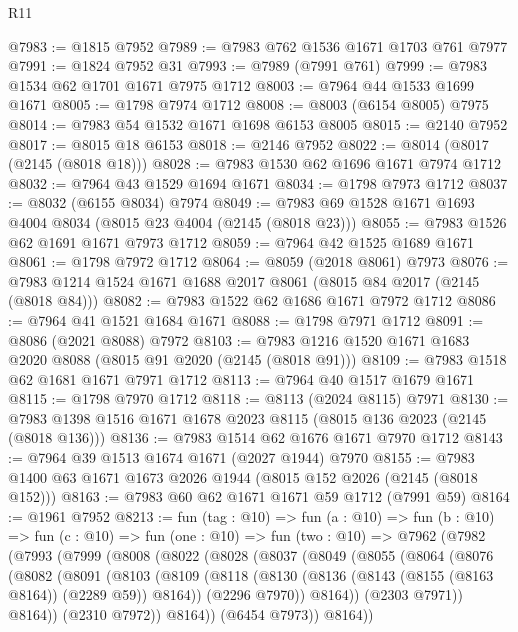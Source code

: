 \begin{lexlean}{R11}
\begin{coremodule}
@7983 := @1815 @7952
@7989 := @7983 @762 @1536 @1671 @1703 @761 @7977
@7991 := @1824 @7952 @31
@7993 := @7989 (@7991 @761)
@7999 := @7983 @1534 @62 @1701 @1671 @7975 @1712
@8003 := @7964 @44 @1533 @1699 @1671
@8005 := @1798 @7974 @1712
@8008 := @8003 (@6154 @8005) @7975
@8014 := @7983 @54 @1532 @1671 @1698 @6153 @8005
@8015 := @2140 @7952
@8017 := @8015 @18 @6153
@8018 := @2146 @7952
@8022 := @8014 (@8017 (@2145 (@8018 @18)))
@8028 := @7983 @1530 @62 @1696 @1671 @7974 @1712
@8032 := @7964 @43 @1529 @1694 @1671
@8034 := @1798 @7973 @1712
@8037 := @8032 (@6155 @8034) @7974
@8049 := @7983 @69 @1528 @1671 @1693 @4004 @8034 (@8015 @23 @4004 (@2145 (@8018 @23)))
@8055 := @7983 @1526 @62 @1691 @1671 @7973 @1712
@8059 := @7964 @42 @1525 @1689 @1671
@8061 := @1798 @7972 @1712
@8064 := @8059 (@2018 @8061) @7973
@8076 := @7983 @1214 @1524 @1671 @1688 @2017 @8061 (@8015 @84 @2017 (@2145 (@8018 @84)))
@8082 := @7983 @1522 @62 @1686 @1671 @7972 @1712
@8086 := @7964 @41 @1521 @1684 @1671
@8088 := @1798 @7971 @1712
@8091 := @8086 (@2021 @8088) @7972
@8103 := @7983 @1216 @1520 @1671 @1683 @2020 @8088 (@8015 @91 @2020 (@2145 (@8018 @91)))
@8109 := @7983 @1518 @62 @1681 @1671 @7971 @1712
@8113 := @7964 @40 @1517 @1679 @1671
@8115 := @1798 @7970 @1712
@8118 := @8113 (@2024 @8115) @7971
@8130 := @7983 @1398 @1516 @1671 @1678 @2023 @8115 (@8015 @136 @2023 (@2145 (@8018 @136)))
@8136 := @7983 @1514 @62 @1676 @1671 @7970 @1712
@8143 := @7964 @39 @1513 @1674 @1671 (@2027 @1944) @7970
@8155 := @7983 @1400 @63 @1671 @1673 @2026 @1944 (@8015 @152 @2026 (@2145 (@8018 @152)))
@8163 := @7983 @60 @62 @1671 @1671 @59 @1712 (@7991 @59)
@8164 := @1961 @7952
@8213 := fun (tag : @10) =>
  fun (a : @10) =>
  fun (b : @10) =>
  fun (c : @10) =>
  fun (one : @10) =>
  fun (two : @10) =>
  @7962
    (@7982
      (@7993
        (@7999
          (@8008
            (@8022
              (@8028
                (@8037
                  (@8049
                    (@8055
                      (@8064
                        (@8076
                          (@8082
                            (@8091
                              (@8103
                                (@8109
                                  (@8118
                                    (@8130 (@8136 (@8143 (@8155 (@8163 @8164)) (@2289 @59)) @8164))
                                    (@2296 @7970))
                                  @8164))
                              (@2303 @7971))
                            @8164))
                        (@2310 @7972))
                      @8164))
                  (@6454 @7973))
                @8164))

\end{coremodule}
\end{lexlean}
